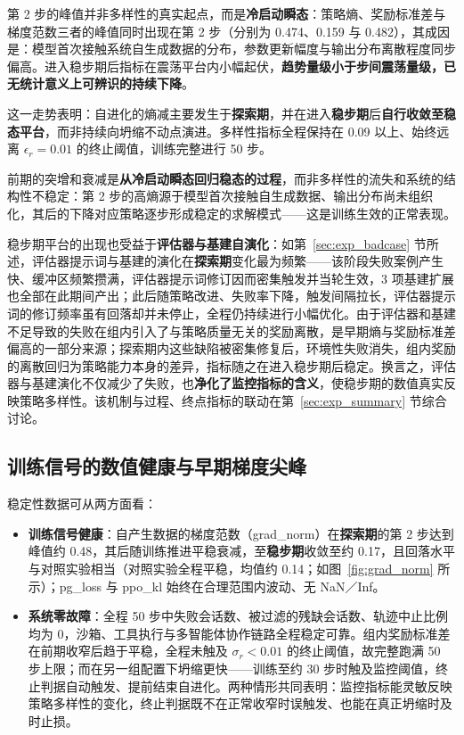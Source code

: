 第 2 步的峰值并非多样性的真实起点，而是\textbf{冷启动瞬态}：策略熵、奖励标准差与梯度范数三者的峰值同时出现在第 2 步（分别为 0.474、0.159 与 0.482），其成因是：模型首次接触系统自生成数据的分布，参数更新幅度与输出分布离散程度同步偏高。进入稳步期后指标在震荡平台内小幅起伏，\textbf{趋势量级小于步间震荡量级，已无统计意义上可辨识的持续下降}。

这一走势表明：自进化的熵减主要发生于\textbf{探索期}，并在进入\textbf{稳步期}后\textbf{自行收敛至稳态平台}，而非持续向坍缩不动点演进。多样性指标全程保持在 0.09 以上、始终远离 $\epsilon_r = 0.01$ 的终止阈值，训练完整进行 50 步。

前期的突增和衰减是\textbf{从冷启动瞬态回归稳态的过程}，而非多样性的流失和系统的结构性不稳定：第 2 步的高熵源于模型首次接触自生成数据、输出分布尚未组织化，其后的下降对应策略逐步形成稳定的求解模式——这是训练生效的正常表现。

稳步期平台的出现也受益于\textbf{评估器与基建自演化}：如第~\ref{sec:exp_badcase} 节所述，评估器提示词与基建的演化在\textbf{探索期}变化最为频繁——该阶段失败案例产生快、缓冲区频繁攒满，评估器提示词修订因而密集触发并当轮生效，3 项基建扩展也全部在此期间产出；此后随策略改进、失败率下降，触发间隔拉长，评估器提示词的修订频率虽有回落却并未停止，全程仍持续进行小幅优化。由于评估器和基建不足导致的失败在组内引入了与策略质量无关的奖励离散，是早期熵与奖励标准差偏高的一部分来源；探索期内这些缺陷被密集修复后，环境性失败消失，组内奖励的离散回归为策略能力本身的差异，指标随之在进入稳步期后稳定。换言之，评估器与基建演化不仅减少了失败，也\textbf{净化了监控指标的含义}，使稳步期的数值真实反映策略多样性。该机制与过程、终点指标的联动在第~\ref{sec:exp_summary} 节综合讨论。

\subsection{训练信号的数值健康与早期梯度尖峰}

稳定性数据可从两方面看：

\begin{itemize}
    \item \textbf{训练信号健康}：自产生数据的梯度范数（grad\_norm）在\textbf{探索期}的第 2 步达到峰值约 0.48，其后随训练推进平稳衰减，至\textbf{稳步期}收敛至约 0.17，且回落水平与对照实验相当（对照实验全程平稳，均值约 0.14；如图~\ref{fig:grad_norm} 所示）；pg\_loss 与 ppo\_kl 始终在合理范围内波动、无 NaN／Inf。
    \item \textbf{系统零故障}：全程 50 步中失败会话数、被过滤的残缺会话数、轨迹中止比例均为 0，沙箱、工具执行与多智能体协作链路全程稳定可靠。组内奖励标准差在前期收窄后趋于平稳，全程未触及 $\sigma_r < 0.01$ 的终止阈值，故完整跑满 50 步上限；而在另一组配置下坍缩更快——训练至约 30 步时触及监控阈值，终止判据自动触发、提前结束自进化。两种情形共同表明：监控指标能灵敏反映策略多样性的变化，终止判据既不在正常收窄时误触发、也能在真正坍缩时及时止损。
\end{itemize}

